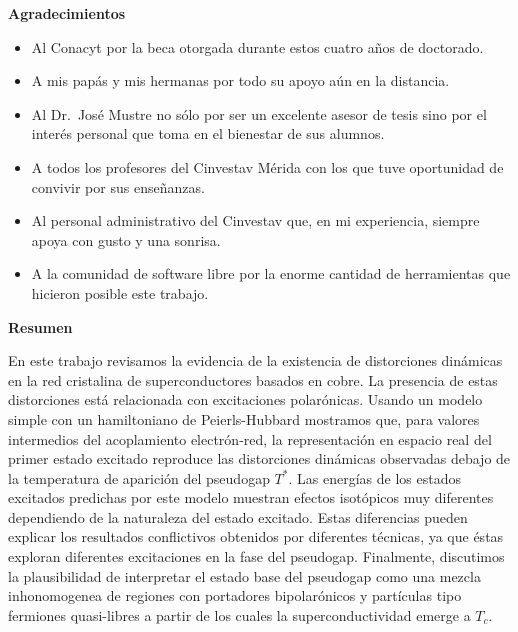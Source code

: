 
\cleardoublepage
{}
{}

\begin{center}
\textbf{\large Agradecimientos}
\end{center}
\vspace{3cm}

\begin{itemize}
    \item Al Conacyt por la beca otorgada durante estos cuatro años de doctorado.
    \item A mis pap\'{a}s y mis hermanas por todo su apoyo a\'{u}n en la distancia.
    \item Al Dr.\ Jos\'{e} Mustre no s\'{o}lo por ser un excelente asesor de tesis sino por el inter\'{e}s personal que toma en el bienestar de sus alumnos.
    \item A todos los profesores del Cinvestav M\'{e}rida con los que tuve oportunidad de convivir por sus enseñanzas.
    \item Al personal administrativo del Cinvestav que, en mi experiencia, siempre apoya con gusto y una sonrisa.
    \item A la comunidad de software libre por la enorme cantidad de herramientas que hicieron posible este trabajo.
\end{itemize}


\cleardoublepage
{}
{}
\begin{center}
\textbf{\large Resumen}
\end{center}
En este trabajo revisamos la evidencia de la existencia de distorciones din\'{a}micas en la red cristalina de superconductores basados en cobre. 
La presencia de estas distorciones est\'{a} relacionada con excitaciones polar\'{o}nicas. 
Usando un modelo simple con un hamiltoniano de Peierls-Hubbard mostramos que, para valores intermedios del acoplamiento electr\'{o}n-red, la representaci\'{o}n en espacio real del primer estado excitado reproduce las distorciones din\'{a}micas observadas debajo de la temperatura de aparici\'{o}n del pseudogap $T^*$. 
Las energ\'{i}as de los estados excitados predichas por este modelo muestran efectos isot\'{o}picos muy diferentes dependiendo de la naturaleza del estado excitado. 
Estas diferencias pueden explicar los resultados conflictivos obtenidos por diferentes t\'{e}cnicas, ya que \'{e}stas exploran diferentes excitaciones en la fase del pseudogap. 
Finalmente, discutimos la plausibilidad de interpretar el estado base del pseudogap como una mezcla inhonomogenea de regiones con portadores bipolar\'{o}nicos y part\'{i}culas tipo fermiones quasi-libres a partir de los cuales la superconductividad emerge a $T_c$.

